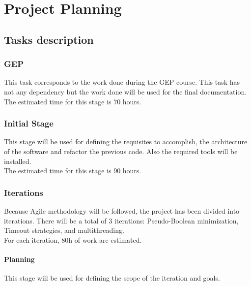 
\chapter{Project Planning} %

\label{Chapter3} %


\section{Tasks description}
\subsection{GEP}
This task corresponds to the work done during the GEP course. This task has not any dependency but the work done will be used for the final documentation.\\

The estimated time for this stage is 70 hours.
\subsection{Initial Stage}
This stage will be used for defining the requisites to accomplish, the architecture of the software and refactor the previous code. Also the required tools will be installed. \\

The estimated time for this stage is 90 hours.
\subsection{Iterations}
Because Agile methodology will be followed, the project has been divided into iterations. There will be a total of 3 iterations: Pseudo-Boolean minimization, Timeout strategies, and multithreading.\\

For each iteration, 80h of work are estimated.
\subsubsection{Planning}
This stage will be used for defining the scope of the iteration and goals.\\

